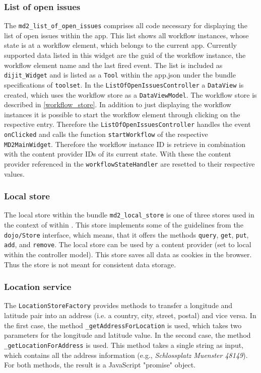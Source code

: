 \subsubsection{List of open issues}
\label{sec:listOfOpenIssues}

The \lstinline!md2_list_of_open_issues! comprises all code necessary for displaying the list of open issues within the app. This list shows all workflow instances, whose state is at a workflow element, which belongs to the current app. Currently supported data listed in this widget are the guid of the workflow instance, the workflow element name and the last fired event. 
The list is included as \lstinline!dijit_Widget! and is listed as a \texttt{Tool} within the app.json under the bundle specifications of \lstinline!toolset!. In the \lstinline!ListOfOpenIssuesController! a \lstinline!DataView! is created, which uses the workflow store as a \lstinline!DataViewModel!. The workflow store is described in \cref{workflow_store}.
In addition to just displaying the workflow instances it is possible to start the workflow element through clicking on the respective entry. Therefore the \lstinline!ListOfOpenIssuesController! handles the event \lstinline!onClicked! and calls the function \lstinline!startWorkflow! of the respective \lstinline!MD2MainWidget!. Therefore the workflow instance ID is retrieve in combination with the content provider IDs of its current state. With these the content provider referenced in the \lstinline!workflowStateHandler! are resetted to their respective values.

\subsubsection{Local store} \label{local_store}



The local store within the bundle \lstinline|md2_local_store| is one of three stores used in the context of \mapapps within \MD. This store implements some of the guidelines from the \lstinline|dojo/Store| interface, which means, that it offers the methods \lstinline|query|, \lstinline|get|, \lstinline|put|, \lstinline|add|, and \lstinline|remove|.
The local store can be used by a content provider (set to local within the controller model). This store saves all data as cookies in the browser. Thus the store is not meant for consistent data storage.

\subsubsection{Location service}
The \lstinline|LocationStoreFactory| provides methods to transfer a longitude and latitude pair into an address (i.e. a country, city, street, postal) and vice versa. In the first case, the method \lstinline|_getAddressForLocation| is used, which takes two parameters for the longitude and latitude value. In the second case, the method \lstinline|_getLocationForAddress| is used. This method takes a single string as input, which contains all the address information (e.g., \textit{Schlossplatz Muenster 48149}). For both methods, the result is a JavaScript "promise" object.

